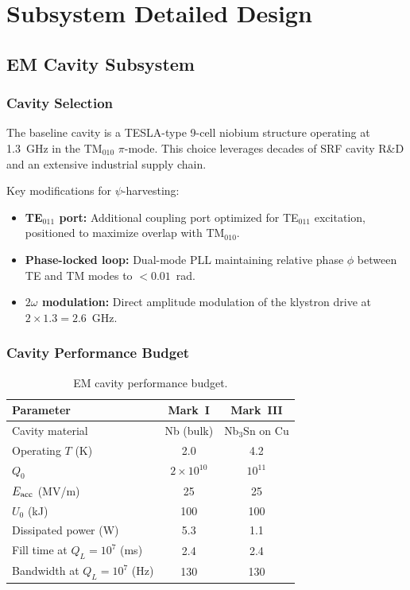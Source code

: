\documentclass[11pt,a4paper]{article}
\begin{document}
\section{Subsystem Detailed Design}

\subsection{EM Cavity Subsystem}

\subsubsection{Cavity Selection}

The baseline cavity is a TESLA-type 9-cell niobium structure operating
at 1.3~GHz in the TM$_{010}$ $\pi$-mode.  This choice leverages decades
of SRF cavity R\&D and an extensive industrial supply chain.

Key modifications for $\psi$-harvesting:
\begin{itemize}
\item \textbf{TE$_{011}$ port:} Additional coupling port optimized for
TE$_{011}$ excitation, positioned to maximize overlap with TM$_{010}$.
\item \textbf{Phase-locked loop:} Dual-mode PLL maintaining relative
phase $\phi$ between TE and TM modes to $< 0.01$~rad.
\item \textbf{$2\omega$ modulation:} Direct amplitude modulation of the
klystron drive at $2\times 1.3 = 2.6$~GHz.
\end{itemize}

\subsubsection{Cavity Performance Budget}

\begin{table}[h]
\centering
\caption{EM cavity performance budget.}
\label{tab:cavity-budget}
\begin{tabular}{@{}lcc@{}}
\toprule
Parameter & Mark~I & Mark~III \\
\midrule
Cavity material & Nb (bulk) & Nb$_3$Sn on Cu \\
Operating $T$ (K) & 2.0 & 4.2 \\
$Q_0$ & $2\times 10^{10}$ & $10^{11}$ \\
$E_{\rm acc}$ (MV/m) & 25 & 25 \\
$U_0$ (kJ) & 100 & 100 \\
Dissipated power (W) & 5.3 & 1.1 \\
Fill time at $Q_L = 10^7$ (ms) & 2.4 & 2.4 \\
Bandwidth at $Q_L = 10^7$ (Hz) & 130 & 130 \\
\bottomrule
\end{tabular}
\end{table}
\end{document}
